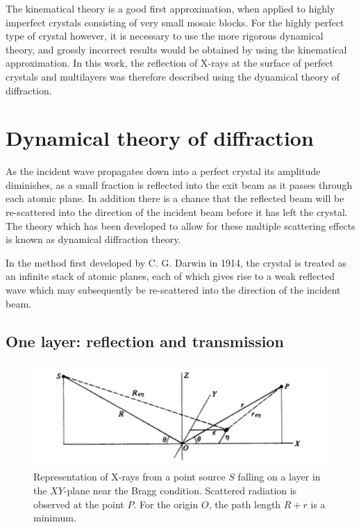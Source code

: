 \documentclass[12pt,oneside,notitlepage,abstracton,a4paper]{scrartcl}
\begin{document}
The kinematical theory is a good first approximation, when applied to highly imperfect crystals consisting of very small mosaic blocks. For the highly perfect type of crystal however, it is necessary to use the more rigorous dynamical theory, and grossly incorrect results would be obtained by using the kinematical approximation.
In this work, the reflection of X-rays at the surface of perfect crystals and multilayers was therefore described using the dynamical theory of diffraction.


\section{Dynamical theory of diffraction}
As the incident wave propagates down into a perfect crystal its amplitude diminishes, as a small fraction is reflected into the exit beam as it passes through each atomic plane. In addition there is a chance that the reflected beam will be re-scattered into the direction of the incident beam before it has left the crystal. The theory which has been developed to allow for these multiple scattering effects is known as dynamical diffraction theory.

In the method first developed by C. G. Darwin in 1914, the crystal is treated as an infinite stack of atomic planes, each of which gives rise to a weak reflected wave which may subsequently be re-scattered into the direction of the incident beam.


\subsection{One layer: reflection and transmission}\label{onelayer}

\begin{figure}[h]
\begin{center}
\includegraphics[width=12cm]{pics/picture1.png}
\vspace{-10pt}
\caption{Representation of X-rays from a point source $S$ falling on a layer in the $XY$-plane near the Bragg condition. Scattered radiation is observed at the point $P$. For the origin $O$, the path length $R+r$ is a minimum.}
\label{pic1}
\vspace{-10pt}
\end{center}
\end{figure}
\end{document}

